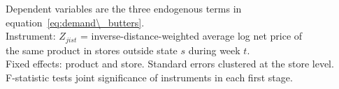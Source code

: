 \begin{table}[htbp]
   \par \raggedright 
   Dependent variables are the three endogenous terms in equation~\ref{eq:demand\_butters}.\\
   Instrument: $Z_{jist}$ = inverse-distance-weighted average log net price of\\
   the same product in stores outside state $s$ during week $t$.\\
   Fixed effects: product and store. Standard errors clustered at the store level.\\
   F-statistic tests joint significance of instruments in each first stage.
\end{table}


